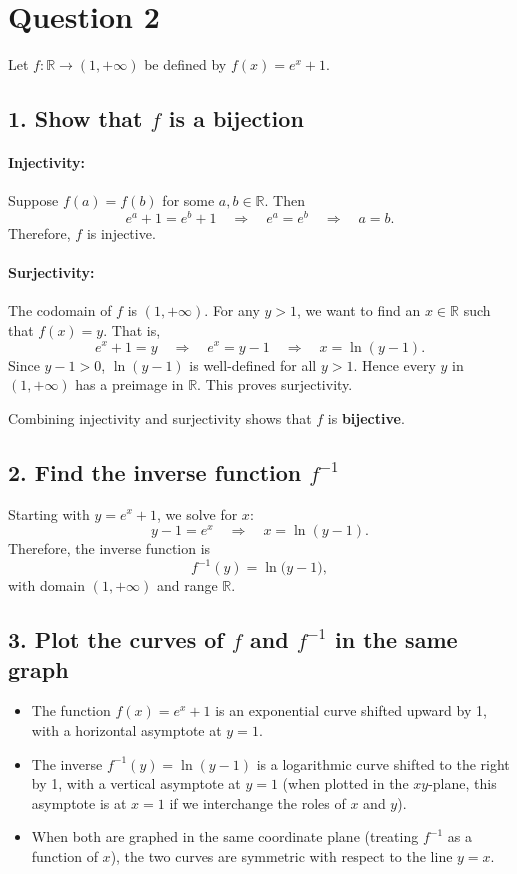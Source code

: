 \documentclass[12pt]{article}
\begin{document}
\section*{Question 2}

Let $f : \mathbb{R} \to (1, +\infty)$ be defined by $f(x) = e^x + 1$.

\subsection*{1. Show that $f$ is a bijection}

\paragraph{Injectivity:}
Suppose $f(a) = f(b)$ for some $a, b \in \mathbb{R}$. Then
\[
  e^a + 1 = e^b + 1 
  \quad \Longrightarrow \quad
  e^a = e^b 
  \quad \Longrightarrow \quad
  a = b.
\]
Therefore, $f$ is injective.

\paragraph{Surjectivity:}
The codomain of $f$ is $(1, +\infty)$. For any $y > 1$, we want to find an $x \in \mathbb{R}$ such that $f(x) = y$. That is,
\[
  e^x + 1 = y 
  \quad \Longrightarrow \quad
  e^x = y - 1 
  \quad \Longrightarrow \quad
  x = \ln(y - 1).
\]
Since $y - 1 > 0$, $\ln(y - 1)$ is well-defined for all $y>1$. Hence every $y$ in $(1,+\infty)$ has a preimage in $\mathbb{R}$. This proves surjectivity.

Combining injectivity and surjectivity shows that $f$ is \textbf{bijective}.

\subsection*{2. Find the inverse function $f^{-1}$}

Starting with $y = e^x + 1$, we solve for $x$:
\[
  y - 1 = e^x
  \quad \Longrightarrow \quad
  x = \ln(y - 1).
\]
Therefore, the inverse function is
\[
  f^{-1}(y) = \ln\bigl(y - 1\bigr), 
\]
with domain $(1,+\infty)$ and range $\mathbb{R}$.

\subsection*{3. Plot the curves of $f$ and $f^{-1}$ in the same graph}

\begin{itemize}
\item The function $f(x) = e^x + 1$ is an exponential curve shifted upward by 1, with a horizontal asymptote at $y = 1$.
\item The inverse $f^{-1}(y) = \ln(y - 1)$ is a logarithmic curve shifted to the right by 1, with a vertical asymptote at $y = 1$ (when plotted in the $xy$-plane, this asymptote is at $x = 1$ if we interchange the roles of $x$ and $y$).
\item When both are graphed in the same coordinate plane (treating $f^{-1}$ as a function of $x$), the two curves are symmetric with respect to the line $y = x$.
\end{itemize}
\end{document}
